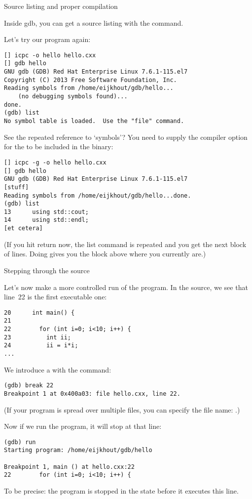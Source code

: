  {Source listing and proper compilation}

Inside gdb, you can get a source listing with the  command.

Let's try our program again:
\begin{verbatim}
[] icpc -o hello hello.cxx
[] gdb hello
GNU gdb (GDB) Red Hat Enterprise Linux 7.6.1-115.el7
Copyright (C) 2013 Free Software Foundation, Inc.
Reading symbols from /home/eijkhout/gdb/hello...
    (no debugging symbols found)...
done.
(gdb) list
No symbol table is loaded.  Use the "file" command.
\end{verbatim}

See the repeated reference to `symbols'?
You need to supply the  compiler option for the 
to be included in the binary:
\begin{verbatim}
[] icpc -g -o hello hello.cxx
[] gdb hello
GNU gdb (GDB) Red Hat Enterprise Linux 7.6.1-115.el7
[stuff]
Reading symbols from /home/eijkhout/gdb/hello...done.
(gdb) list
13      using std::cout;
14      using std::endl;
[et cetera]
\end{verbatim}
(If you hit return now, the list command is repeated and you get the next block of lines.
Doing  gives you the block above where you currently are.)

 {Stepping through the source}

Let's now make a more controlled run of the program.
In the source, we see that line~22 is the first executable one:
\begin{lstlisting}
20      int main() {
21
22        for (int i=0; i<10; i++) {
23          int ii;
24          ii = i*i;
...
\end{lstlisting}

We introduce a  with the  command:
\begin{verbatim}
(gdb) break 22
Breakpoint 1 at 0x400a03: file hello.cxx, line 22.
\end{verbatim}
(If your program is spread over multiple files,
you can specify the file name: .)

Now if we run the program, it will stop at that line:
\begin{verbatim}
(gdb) run
Starting program: /home/eijkhout/gdb/hello

Breakpoint 1, main () at hello.cxx:22
22        for (int i=0; i<10; i++) {
\end{verbatim}
To be precise: the program is stopped in the state before it executes this line.

